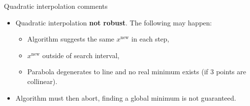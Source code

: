 \documentclass[11pt,compress,t,notes=noshow, xcolor=table]{beamer}
\begin{document}
\begin{vbframe}{Quadratic interpolation comments}
\begin{itemize}
\item Quadratic interpolation \textbf{not robust}. The following may happen:
\begin{itemize}
\item Algorithm suggests the same $x^{\text{new}}$ in each step,
\item $x^{\text{new}}$ outside of search interval,
\item Parabola degenerates to line and no real minimum exists (if 3 points are collinear).
\end{itemize}
\item Algorithm must then abort, finding a global minimum is not guaranteed.
\end{itemize}
\end{vbframe}
\end{document}
